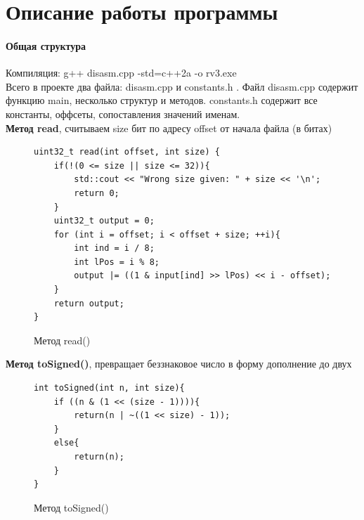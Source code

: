 \documentclass{article}
\begin{document}
\section*{Описание работы программы}
\paragraph{Общая структура}
Компиляция: g++ disasm.cpp -std=c++2a -o rv3.exe\\
Всего в проекте два файла: disasm.cpp и constants.h . Файл disasm.cpp содержит функцию main, несколько структур и методов. constants.h содержит все константы, оффсеты, сопоставления значений именам.\\
\textbf{Метод read}, считываем size бит по адресу offset от начала файла (в битах)
\begin{figure}[H]
	\begin{lstlisting}
uint32_t read(int offset, int size) {
	if(!(0 <= size || size <= 32)){
		std::cout << "Wrong size given: " + size << '\n';
		return 0;
	}
	uint32_t output = 0;
	for (int i = offset; i < offset + size; ++i){
		int ind = i / 8;
		int lPos = i % 8;
		output |= ((1 & input[ind] >> lPos) << i - offset);
	}
	return output;
}
	\end{lstlisting}
\caption{Метод read()}
\end{figure}
\textbf{Метод toSigned()}, превращает беззнаковое число в форму дополнение до двух
\begin{figure}[H]
	\begin{lstlisting}
int toSigned(int n, int size){
	if ((n & (1 << (size - 1)))){
		return(n | ~((1 << size) - 1));
	}
	else{
		return(n);
	}
}
	\end{lstlisting}
	\caption{Метод toSigned()}
\end{figure}
\end{document}
